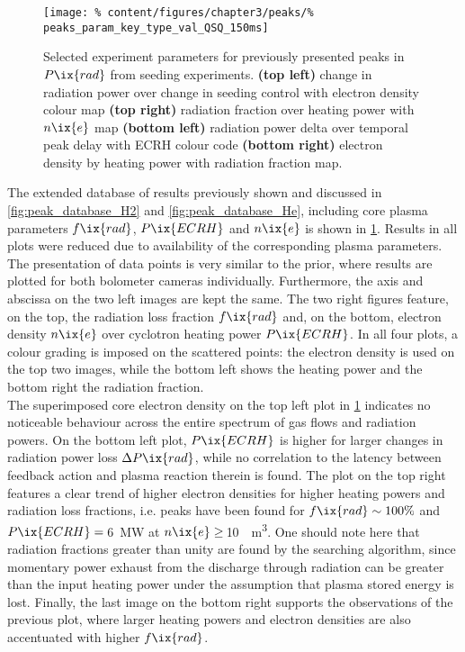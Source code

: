 %
        \begin{figure}[t]%
            \centering%
            \texttt{[image: \%
                content/figures/chapter3/peaks/\%
                peaks\_param\_key\_type\_val\_QSQ\_150ms]}%
            \caption{Selected experiment parameters for previously presented peaks in $P\ix{rad}$ from seeding experiments. \textbf{(top left)} change in radiation power over change in seeding control with electron density colour map \textbf{(top right)} radiation fraction over heating power with $n\ix{e}$ map \textbf{(bottom left)} radiation power delta over temporal peak delay with ECRH colour code \textbf{(bottom right)} electron density by heating power with radiation fraction map.}\label{fig:peak_parameters_QSQ}%
        \end{figure}%
%
        The extended database of results previously shown and discussed in \cref{fig:peak_database_H2} and \ref{fig:peak_database_He}, including core plasma parameters $f\ix{rad}$, $P\ix{ECRH}$ and $n\ix{e}$ is shown in \cref{fig:peak_parameters_QSQ}. Results in all plots were reduced due to availability of the corresponding plasma parameters. The presentation of data points is very similar to the prior, where results are plotted for both bolometer cameras individually. Furthermore, the axis and abscissa on the two left images are kept the same. The two right figures feature, on the top, the radiation loss fraction $f\ix{rad}$ and, on the bottom, electron density $n\ix{e}$ over cyclotron heating power $P\ix{ECRH}$. In all four plots, a colour grading is imposed on the scattered points: the electron density is used on the top two images, while the bottom left shows the heating power and the bottom right the radiation fraction.\\%
        The superimposed core electron density on the top left plot in \cref{fig:peak_parameters_QSQ} indicates no noticeable behaviour across the entire spectrum of gas flows and radiation powers. On the bottom left plot, $P\ix{ECRH}$ is higher for larger changes in radiation power loss $\Delta P\ix{rad}$, while no correlation to the latency between feedback action and plasma reaction therein is found. The plot on the top right features a clear trend of higher electron densities for higher heating powers and radiation loss fractions, i.e. peaks have been found for $f\ix{rad}\sim100\%$ and $P\ix{ECRH}=\,$\SI{6}{\mega\watt} at $n\ix{e}\ge\,$\SI{10}{\per\cubic\meter}. One should note here that radiation fractions greater than unity are found by the searching algorithm, since momentary power exhaust from the discharge through radiation can be greater than the input heating power under the assumption that plasma stored energy is lost. Finally, the last image on the bottom right supports the observations of the previous plot, where larger heating powers and electron densities are also accentuated with higher $f\ix{rad}$.\\%
